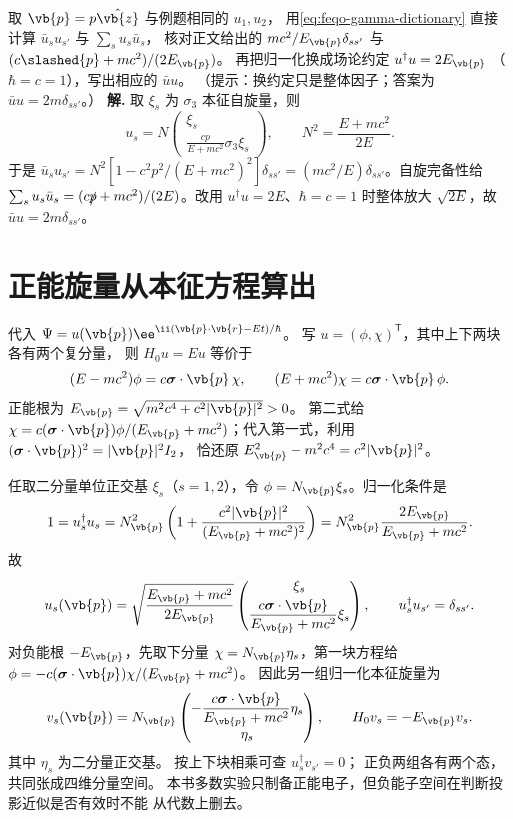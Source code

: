 \par
\begin{workedexample}
取 \(\vb{p}=p\hat{\vb{z}}\) 与例题相同的 \(u_1,u_2\)，
用\cref{eq:feqo-gamma-dictionary} 直接计算
\(\bar u_su_{s'}\) 与 \(\sum_su_s\bar u_s\)，
核对正文给出的 \(mc^2/E_{\vb{p}}\delta_{ss'}\) 与
\((c\slashed{p}+mc^2)/(2E_{\vb{p}})\)。
再把归一化换成场论约定 \(u^\dagger u=2E_{\vb{p}}\)
（\(\hbar=c=1\)），写出相应的 \(\bar uu\)。
（提示：换约定只是整体因子；答案为 \(\bar uu=2m\delta_{ss'}\)。）
\textbf{解.} 取 \(\xi_s\) 为 \(\sigma_3\) 本征自旋量，则
\[
u_s=N\begin{pmatrix}\xi_s\\ \frac{cp}{E+mc^2}\sigma_3\xi_s\end{pmatrix},
\qquad N^2=\frac{E+mc^2}{2E}.
\]
于是 \(\bar u_su_{s'}=N^2[1-c^2p^2/(E+mc^2)^2]\delta_{ss'}=(mc^2/E)\delta_{ss'}\)。自旋完备性给 \(\sum_su_s\bar u_s=(c\slashed p+mc^2)/(2E)\)。改用 \(u^\dagger u=2E\)、\(\hbar=c=1\) 时整体放大 \(\sqrt{2E}\)，故 \(\bar uu=2m\delta_{ss'}\)。
\end{workedexample}
\par
\section{正能旋量从本征方程算出}
\label{sec:feqo-positive-spinor}

代入 \(\Psi=u(\vb{p})
\ee^{\ii(\vb{p}\cdot\vb{r}-Et)/\hbar}\)。
写 \(u=(\phi,\chi)^\mathsf T\)，其中上下两块各有两个复分量，
则 \(H_0u=Eu\) 等价于
\[
(E-mc^2)\phi=c\boldsymbol\sigma\cdot\vb{p}\,\chi,\qquad
(E+mc^2)\chi=c\boldsymbol\sigma\cdot\vb{p}\,\phi.
\]
正能根为 \(E_{\vb{p}}=\sqrt{m^2c^4+c^2|\vb{p}|^2}>0\)。
第二式给 \(\chi=c(\boldsymbol\sigma\cdot\vb{p})\phi/
(E_{\vb{p}}+mc^2)\)；代入第一式，利用
\((\boldsymbol\sigma\cdot\vb{p})^2=|\vb{p}|^2I_2\)，
恰还原 \(E_{\vb{p}}^2-m^2c^4=c^2|\vb{p}|^2\)。

任取二分量单位正交基 \(\xi_s\)（\(s=1,2\)），令
\(\phi=N_{\vb{p}}\xi_s\)。归一化条件是
\[
1=u_s^\dagger u_s
=N_{\vb{p}}^2
\left(1+\frac{c^2|\vb{p}|^2}{(E_{\vb{p}}+mc^2)^2}\right)
=N_{\vb{p}}^2\frac{2E_{\vb{p}}}{E_{\vb{p}}+mc^2}.
\]
故
\begin{equation}
u_s(\vb{p})=
\sqrt{\frac{E_{\vb{p}}+mc^2}{2E_{\vb{p}}}}
\begin{pmatrix}
\xi_s\\[1mm]
\dfrac{c\boldsymbol\sigma\cdot\vb{p}}{E_{\vb{p}}+mc^2}\xi_s
\end{pmatrix},
\qquad
u_s^\dagger u_{s'}=\delta_{ss'}.
\label{eq:feqo-positive-spinor}
\end{equation}
对负能根 \(-E_{\vb{p}}\)，先取下分量
\(\chi=N_{\vb{p}}\eta_s\)，第一块方程给
\(\phi=-c(\boldsymbol\sigma\cdot\vb{p})\chi/(E_{\vb{p}}+mc^2)\)。
因此另一组归一化本征旋量为
\[
v_s(\vb{p})=N_{\vb{p}}
\begin{pmatrix}
-\dfrac{c\boldsymbol\sigma\cdot\vb{p}}
{E_{\vb{p}}+mc^2}\eta_s\\[1mm]\eta_s
\end{pmatrix},
\qquad H_0v_s=-E_{\vb{p}}v_s .
\]
其中 \(\eta_s\) 为二分量正交基。
按上下块相乘可查 \(u_s^\dagger v_{s'}=0\)；
正负两组各有两个态，共同张成四维分量空间。
本书多数实验只制备正能电子，但负能子空间在判断投影近似是否有效时不能
从代数上删去。


